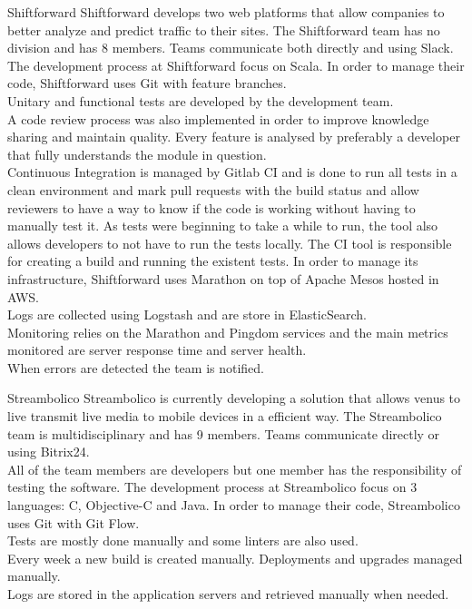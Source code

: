     \begin{companyreport}{Shiftforward}
      \product
      Shiftforward develops two web platforms that allow companies to better analyze and predict traffic to their sites.
      \teams
      The Shiftforward team has no division and has 8 members. Teams communicate both directly and using Slack.
      \development
      The development process at Shiftforward focus on Scala. In order to manage their code, Shiftforward uses Git with feature branches.\\
      Unitary and functional tests are developed by the development team.\\
      A code review process was also implemented in order to improve knowledge sharing and maintain quality. Every feature is analysed by preferably a developer that fully understands the module in question.\\
      Continuous Integration is managed by Gitlab CI and is done to run all tests in a clean environment and mark pull requests with the build status and allow reviewers to have a way to know if the code is working without having to manually test it. As tests were beginning to take a while to run, the tool also allows developers to not have to run the tests locally. The CI tool is  responsible for creating a build and running the existent tests.
      \operations
      In order to manage its infrastructure, Shiftforward uses Marathon on top of Apache Mesos hosted in AWS.\\
      Logs are collected using Logstash and are store in ElasticSearch.\\
      Monitoring relies on the Marathon and Pingdom services and the main metrics monitored are server response time and server health.\\
      When errors are detected the team is notified.
      \reportend
    \end{companyreport}

    \begin{companyreport}{Streambolico}
      \product
      Streambolico is currently developing a solution that allows venus to live transmit live media to mobile devices in a efficient way.
      \teams
      The Streambolico team is multidisciplinary and has 9 members. Teams communicate directly or using Bitrix24.\\
      All of the team members are developers but one member has the responsibility of testing the software.
      \development
      The development process at Streambolico focus on 3 languages: C, Objective-C and Java. In order to manage their code, Streambolico uses Git with Git Flow.\\
      Tests are mostly done manually and some linters are also used.\\
      Every week a new build is created manually.
      \operations
      Deployments and upgrades managed manually. \\
      Logs are stored in the application servers and retrieved manually when needed.
      \reportend
    \end{companyreport}

